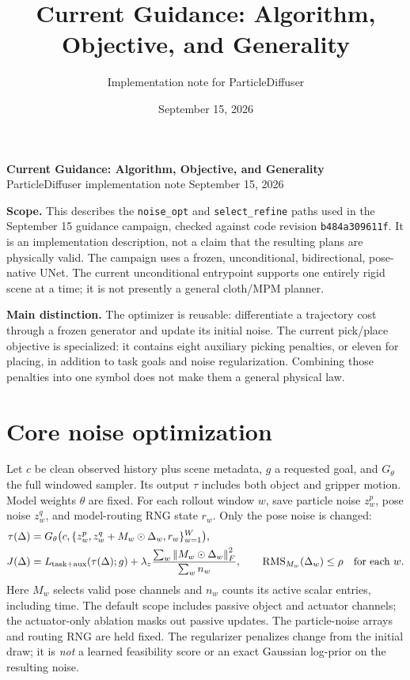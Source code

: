 \documentclass[10pt]{article}
\title{Current Guidance: Algorithm, Objective, and Generality}
\author{Implementation note for ParticleDiffuser}
\date{September 15, 2026}
\newcommand{\norm}[1]{\left\lVert#1\right\rVert}
\newcommand{\rms}{\operatorname{RMS}}
\newcommand{\pathcode}[1]{\nolinkurl{#1}}
\begin{document}
\begin{center}
{\Large\bfseries Current Guidance: Algorithm, Objective, and Generality}\\[4pt]
ParticleDiffuser implementation note \quad September 15, 2026
\end{center}

\textbf{Scope.} This describes the \pathcode{noise_opt} and
\pathcode{select_refine} paths used in the September 15 guidance campaign,
checked against code revision \pathcode{b484a309611f}.
It is an implementation description, not a claim that the resulting plans are
physically valid. The campaign uses a frozen, unconditional, bidirectional,
pose-native UNet. The current unconditional entrypoint supports one entirely
rigid scene at a time; it is not presently a general cloth/MPM planner.

\textbf{Main distinction.} The optimizer is reusable: differentiate a trajectory
cost through a frozen generator and update its initial noise. The current
pick/place objective is specialized: it contains eight auxiliary picking
penalties, or eleven for placing, in addition to task goals and noise
regularization. Combining those penalties into one symbol does not make them
a general physical law.

\section{Core noise optimization}
Let $c$ be clean observed history plus scene metadata, $g$ a requested goal,
and $G_\theta$ the full windowed sampler. Its output $\tau$ includes both object
and gripper motion. Model weights $\theta$ are fixed. For each rollout window
$w$, save particle noise $z_w^p$, pose noise $z_w^q$, and model-routing RNG state
$r_w$. Only the pose noise is changed:
\begin{align}
 \tau(\Delta)&=G_\theta\bigl(c,\{z_w^p,z_w^q+M_w\odot\Delta_w,r_w\}_{w=1}^W\bigr),\\
 J(\Delta)&=L_{\rm task+aux}(\tau(\Delta);g)
       +\lambda_z\frac{\sum_w\norm{M_w\odot\Delta_w}_F^2}{\sum_w n_w},
 \qquad
 \rms_{M_w}(\Delta_w)\leq\rho\quad\text{for each }w.
\end{align}
Here $M_w$ selects valid pose channels and $n_w$ counts its active scalar entries,
including time. The default scope includes passive object and actuator channels;
the actuator-only ablation masks out passive updates. The particle-noise arrays
and routing RNG are held fixed. The regularizer penalizes change from the
initial draw; it is \emph{not} a learned feasibility score or an exact Gaussian
log-prior on the resulting noise.
\end{document}
